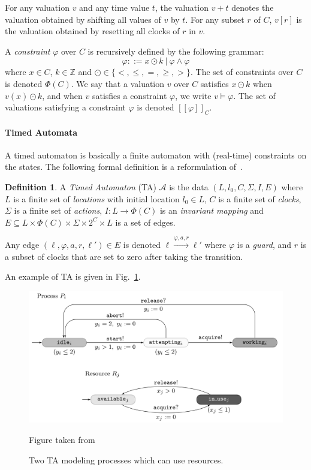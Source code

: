 \documentclass[11pt]{article}
\theoremstyle{definition}
\newtheorem{definition}{Definition}
\theoremstyle{remark}
\theoremstyle{definition}
\begin{document}
For any valuation $v$ and any time value $t$, the valuation $v + t$ denotes the valuation obtained by shifting all values of $v$ by $t$. For any subset $r$ of $C$, $v[r]$ is the valuation obtained by resetting all clocks of $r$ in $v$.

A \emph{constraint} $\varphi$ over $C$ is recursively defined by the following grammar:
\begin{equation*}
	\varphi ::= x \odot k\ |\ \varphi \land \varphi
\end{equation*}
where $x\in C$, $k \in \mathbb{Z}$ and $\odot \in \{<, \leq, =, \geq, >\}$.
The set of constraints over $C$ is denoted $\Phi(C)$.
We say that a valuation $v$ over $C$ satisfies $x \odot k$ when $v(x) \odot k$, and when $v$ satisfies a constraint $\varphi$, we write $v \models \varphi$. The set of valuations satisfying a constraint $\varphi$ is denoted $[\![\varphi]\!]_C$.


\paragraph{Timed Automata}\label{par:ta}
A timed automaton is basically a finite automaton with (real-time) constraints on the states.
The following formal definition is a reformulation of~\cite[Chapter 29.2, Definition 1]{handbook}.
\begin{definition}\label{def:ta}
	A \emph{Timed Automaton} (TA) $\mathcal{A}$ is the data $(L, l_0, C, \Sigma, I, E)$ where
	$L$ is a finite set of \emph{locations} with initial location $l_0 \in L$,
	$C$ is a finite set of \emph{clocks},
	$\Sigma$ is a finite set of \emph{actions},
	$I \colon L \to \Phi(C)$ is an \emph{invariant mapping} and
	$E \subseteq L \times \Phi(C) \times \Sigma \times 2^{C} \times L$ is a set of edges.

	Any edge $(\ell, \varphi, a, r, \ell') \in E$ is denoted $\ell \xrightarrow{\varphi, a, r} \ell'$ where $\varphi$ is a \emph{guard}, and $r$ is a subset of clocks that are set to zero after taking the transition.
\end{definition}
An example of TA is given in Fig.~\ref{fig:ta_ex}.

\begin{figure}[ht]
\centering
\includegraphics[width=.75\textwidth]{../img/TAex.png}
\caption{Two TA modeling processes which can use resources.}\label{fig:ta_ex}
\tiny{Figure taken from \cite[Chapter 29.2]{handbook}}
\end{figure}
\end{document}

